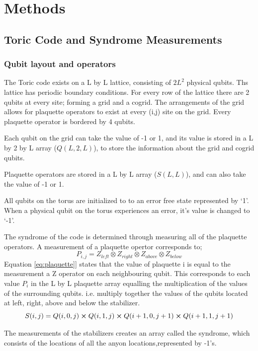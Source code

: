 
\chapter{Methods}
\section{Toric Code and Syndrome Measurements}
\subsection{Qubit layout and operators}
	The Toric code exists on a L by L lattice, consisting of $2L^2$ physical qubits. Ths lattice has periodic boundary conditions. For every row of the lattice there are 2 qubits at every site; forming a grid and a cogrid. The arrangements of the grid allows for plaquette operators to exist at every (i,j) site on the grid. Every plaquette operator is bordered by 4 qubits.
	
	Each qubit on the grid can take the value of -1 or 1, and its value is stored in a L by 2 by L array ($Q(L,2,L)$), to store the information about the grid and cogrid qubits. 
	
	Plaquette operators are stored in a L by L array ($S(L,L)$), and can also take the value of -1 or 1. 
	
	All qubits on the torus are initialized to to an error free state represented by `1'. When a physical qubit on the torus experiences an error, it's value is changed to `-1'. 
	
	 The syndrome of the code is determined through measuring all of the plaquette operators. A measurement of a plaquette opertor corresponds to;
	 \begin{equation}
		P_{i,j}=Z_{left} \otimes Z_{right} \otimes Z_{above} \otimes Z_{below} 
		\label{eq:plaquette]}
	 \end{equation}
	Equation \ref{eq:plaquette]} states that the value of plaquette i is equal to the measurement a Z operator on each neighbouring qubit. This corresponds to each value $P_i$ in the L by L plaquette array equalling the multiplication of the values of the surrounding qubits. i.e. multiply together the values of the qubits located at left, right, above and below the stabilizer. 
	\begin{equation}
		S(i,j) = 	Q(i,0,j)\cross Q(i,1,j)\cross Q(i+1,0,j+1) \cross Q(i+1,1,j+1)
	\end{equation}
	
	The measurements of the stabilizers creates an array called the syndrome, which consists of the locations of all the anyon locations,represented by -1's. 
	
